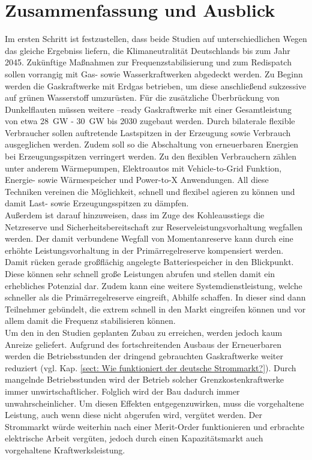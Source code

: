 \section{Zusammenfassung und Ausblick}

	Im ersten Schritt ist festzustellen, dass beide Studien auf unterschiedlichen Wegen das gleiche Ergebniss liefern, die Klimaneutralität Deutschlands bis zum Jahr 2045.
	Zukünftige Maßnahmen zur Frequenzstabilisierung und zum Redispatch sollen vorrangig mit Gas- sowie Wasserkraftwerken abgedeckt werden.
	Zu Beginn werden die Gaskraftwerke mit Erdgas betrieben, um diese anschließend sukzessive auf grünen Wasserstoff umzurüsten.
	Für die zusätzliche Überbrückung von Dunkelflauten müssen weitere \Htwo--ready Gaskraftwerke mit einer Gesamtleistung von etwa \SI{28}{\giga\watt} - \SI{30}{\giga\watt} bis 2030 zugebaut werden.
	Durch bilaterale flexible Verbraucher sollen auftretende Lastspitzen in der Erzeugung sowie Verbrauch ausgeglichen werden.
	Zudem soll so die Abschaltung von erneuerbaren Energien bei Erzeugungsspitzen verringert werden.
	Zu den flexiblen Verbrauchern zählen unter anderem Wärmepumpen, Elektroautos mit Vehicle-to-Grid Funktion, Energie- sowie Wärmespeicher und Power-to-X Anwendungen.
	All diese Techniken vereinen die Möglichkeit, schnell und flexibel agieren zu können und damit Last- sowie Erzeugungsspitzen zu dämpfen. \\
	
	Außerdem ist darauf hinzuweisen, dass im Zuge des Kohleausstiegs die Netzreserve und Sicherheitsbereitschaft zur Reserveleistungsvorhaltung wegfallen werden.
	Der damit verbundene Wegfall von Momentanreserve kann durch eine erhöhte Leistungsvorhaltung in der Primärregelreserve kompensiert werden.
	Damit rücken gerade großflächig angelegte Batteriespeicher in den Blickpunkt.
	Diese können sehr schnell große Leistungen abrufen und stellen damit ein erhebliches Potenzial dar. 
	Zudem kann eine weitere Systemdienstleistung, welche schneller als die Primärregelreserve eingreift, Abhilfe  schaffen.
	In dieser sind dann Teilnehmer gebündelt, die extrem schnell in den Markt eingreifen können und vor allem damit die Frequenz stabilisieren können. \\
	
	Um den in den Studien geplanten Zubau zu erreichen, werden jedoch kaum Anreize geliefert.
	Aufgrund des fortschreitenden Ausbaus der Erneuerbaren werden die Betriebsstunden der dringend gebrauchten Gaskraftwerke weiter reduziert (vgl. Kap. \ref{sect: Wie funktioniert der deutsche Strommarkt?}).
	Durch mangelnde Betriebsstunden wird der Betrieb solcher Grenzkostenkraftwerke immer unwirtschaftlicher.
	Folglich wird der Bau dadurch immer unwahrscheinlicher.
	Um diesen Effekten entgegenzuwirken, muss die vorgehaltene Leistung, auch wenn diese nicht abgerufen wird, vergütet werden.
	Der Strommarkt würde weiterhin nach einer Merit-Order funktionieren und erbrachte elektrische Arbeit vergüten, jedoch durch einen Kapazitätsmarkt auch vorgehaltene Kraftwerksleistung. \\
	
